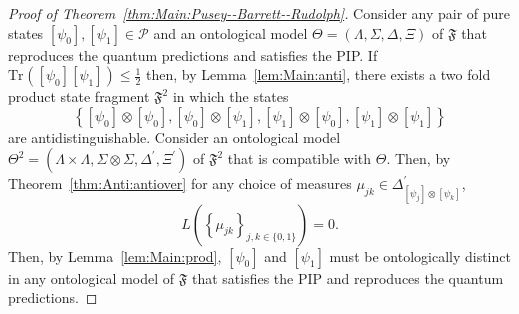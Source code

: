 \documentclass[DIV=calc,fontsize=12pt]{scrartcl} %
\theoremstyle{definition}
\theoremstyle{plain}
\newcommand{\Proj}[1]{\ensuremath{\left [ #1 \right ]}}
\newcommand{\Tr}[2][]{\ensuremath{\text{Tr}_{#1} \left ( #2 \right )}}
\begin{document}
\begin{proof}[Proof of Theorem~\ref{thm:Main:Pusey--Barrett--Rudolph}]
Consider any pair of pure states $\Proj{\psi_0}, \Proj{\psi_1} \in
\mathcal{P}$ and an ontological model $\Theta = (\Lambda, \Sigma,
\Delta, \Xi)$ of $\mathfrak{F}$ that reproduces the quantum
predictions and satisfies the PIP\@.  If
$\Tr{\Proj{\psi_0}\Proj{\psi_1}} \leq \frac{1}{2}$ then, by
Lemma~\ref{lem:Main:anti}, there exists a two fold product state
fragment $\mathfrak{F}^2$ in which the states
\begin{equation}
\left \{ \Proj{\psi_0} \otimes \Proj{\psi_0}, \Proj{\psi_0}
\otimes \Proj{\psi_1}, \Proj{\psi_1} \otimes \Proj{\psi_0},
\Proj{\psi_1} \otimes \Proj{\psi_1}\right \}
\end{equation}
are antidistinguishable.  Consider an ontological model $\Theta^2 =
(\Lambda \times \Lambda, \Sigma \otimes \Sigma, \Delta^{\prime},
\Xi^{\prime})$ of $\mathfrak{F}^2$ that is compatible with $\Theta$.
Then, by Theorem~\ref{thm:Anti:antiover} for any choice of measures
$\mu_{jk} \in \Delta^{\prime}_{\Proj{\psi_j}\otimes\Proj{\psi_k}}$,
\begin{equation}
L \left ( \left \{ \mu_{jk} \right \}_{j,k \in \{0,1\}} \right
) = 0.
\end{equation}
Then, by Lemma~\ref{lem:Main:prod}, $\Proj{\psi_0}$ and
$\Proj{\psi_1}$ must be ontologically distinct in any ontological
model of $\mathfrak{F}$ that satisfies the PIP and reproduces the
quantum predictions.


\end{proof}
\end{document}
